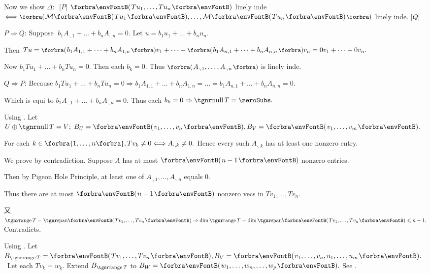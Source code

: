 Now we show $\Delta:\,$ [$P$] $\Par{Tu_1,\dots,Tu_n}$ linely inde $\Longleftrightarrow\BigPar{\Mt{Tu_1},\dots,\Mt{Tu_n}}$ linely inde. [$Q$]\vspace{2pt}\par\quad
$P\Rightarrow Q:$\,\;Suppose $\;b_1A_{\cdot,1}+\dots+b_nA_{\cdot,n}=0.$ \;Let $u=b_1u_1+\dots+b_nu_n.$\par\quad
{}Then $Tu=\BigPar{b_1A_{1,1}+\dots+b_nA_{1,n}}v_1+\dots+\BigPar{b_1A_{n,1}+\dots+b_nA_{n,n}}v_n=0v_1+\dots+0v_n.$\par\quad
{}Now $b_1Tu_1+\dots+b_nTu_n=0.$ Then each $b_k=0.$ Thus $\BigPar{A_{\cdot,1},\dots,A_{\cdot,n}}$ is linely inde.\vspace{4pt}\par\quad
$Q\Rightarrow P:$\,\;Because $b_1Tu_1+\dots+b_nTu_n=0\Rightarrow b_1A_{1,1}+\dots+b_nA_{1,n}=\dots=b_1A_{n,1}+\dots+b_nA_{n,n}=0.$\par\quad
{}Which is equi to $b_1A_{\cdot,1}+\dots+b_nA_{\cdot,n}=0.$ Thus each $b_k=0\Rightarrow\null T=\zeroSubs.$\PfEnd
\SepLine

\par\quad
Using . Let $U\oplus\null T=V;\;B_U=\Par{v_1,\dots,v_n},B_V=\Par{v_1,\dots,v_m}.$\par\quad
For each $k\in\Bra{1,\dots,n},Tv_k\neq 0\Longleftrightarrow A_{\cdot,k}\neq 0.$ Hence every such $A_{\cdot,k}$ has at least one nonzero entry.\PfEnd\vspace{4pt}\par\quad
\Or We prove by contradiction. Suppose $A$ has at most $\Par{n-1}$ nonzero entries.\par\quad
Then by Pigeon Hole Principle, at least one of $A_{\cdot,1},\dots,A_{\cdot,n}$ equals $0$.\par\quad
Thus there are at most $\Par{n-1}$ nonzero vecs in $Tv_{1},\dots,Tv_n.$\par\quad
又 $\range T=\Span{Tv_{1},\dots,Tv_n}\Rightarrow\dim\range T=\dim\Span{Tv_{1},\dots,Tv_n}\leqslant n-1.$ Contradicts.\PfEnd
\SepLine

Using . Let $B_{\range T}=\Par{Tv_1,\dots,Tv_n},B_V=\Par{v_1,\dots,v_n,u_1,\dots,u_m}.$\PfEnd\vspace{2pt}
\Comment \,\,\,Let each $Tv_k=w_k.$ Extend $B_{\range T}$ to $B_W=\Par{w_1,\dots,w_n,\dots,w_p}.$ See .
\SepLine

